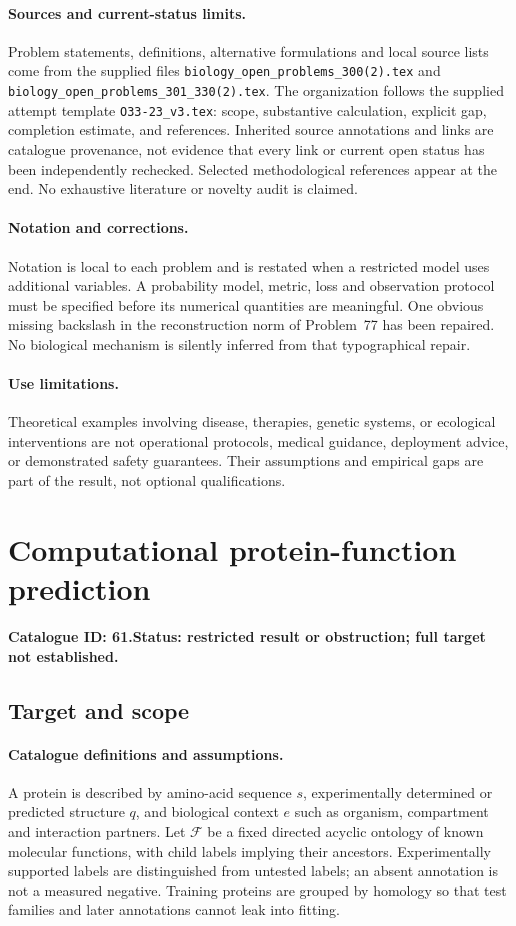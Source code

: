 \documentclass[11pt]{article}
\begin{document}
\paragraph{Sources and current-status limits.}
Problem statements, definitions, alternative formulations and local source lists
come from the supplied files
\texttt{biology\_open\_problems\_300(2).tex} and
\texttt{biology\_open\_problems\_301\_330(2).tex}.
The organization follows the supplied attempt template
\texttt{O33-23\_v3.tex}: scope, substantive calculation, explicit gap,
completion estimate, and references. Inherited source annotations and links are
catalogue provenance, not evidence that every link or current open status has
been independently rechecked. Selected methodological references appear at the
end. No exhaustive literature or novelty audit is claimed.

\paragraph{Notation and corrections.}
Notation is local to each problem and is restated when a restricted model uses
additional variables. A probability model, metric, loss and observation protocol
must be specified before its numerical quantities are meaningful. One obvious
missing backslash in the reconstruction norm of Problem~77 has been repaired.
No biological mechanism is silently inferred from that typographical repair.

\paragraph{Use limitations.}
Theoretical examples involving disease, therapies, genetic systems, or ecological
interventions are not operational protocols, medical guidance, deployment advice,
or demonstrated safety guarantees. Their assumptions and empirical gaps are part
of the result, not optional qualifications.

\setcounter{section}{60}
\section{Computational protein-function prediction}
\label{prob:061}
\noindent\textbf{Catalogue ID: 61.}\quad \textbf{Status: restricted result or obstruction; full target not established.}
\subsection{Target and scope}
\paragraph{Catalogue definitions and assumptions.}
A protein is described by amino-acid sequence $s$, experimentally determined or predicted structure $q$, and biological context $e$ such as organism, compartment and interaction partners. Let $\mathcal F$ be a fixed directed acyclic ontology of known molecular functions, with child labels implying their ancestors. Experimentally supported labels are distinguished from untested labels; an absent annotation is not a measured negative. Training proteins are grouped by homology so that test families and later annotations cannot leak into fitting.
\end{document}
